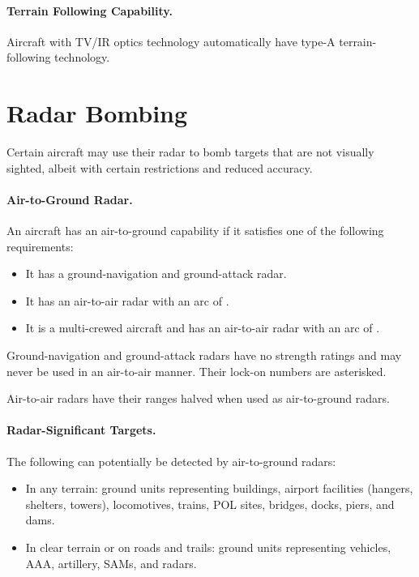 \begin{advancedrules}
{\paragraph{Terrain Following Capability.} Aircraft with TV/IR optics technology automatically have type-A terrain-following technology.

\section{Radar Bombing}

Certain aircraft may use their radar to bomb targets that are not visually sighted, albeit with certain restrictions and reduced accuracy.

\paragraph{Air-to-Ground Radar.} An aircraft has an air-to-ground capability if it satisfies one of the following requirements: 
\begin{itemize}
\item It has a ground-navigation and ground-attack radar.
\item It has an air-to-air radar with an arc of .
\item It is a multi-crewed aircraft and has an air-to-air radar with an arc of .
\end{itemize}

Ground-navigation and ground-attack radars have no strength ratings and may never be used in an air-to-air manner. Their lock-on numbers are asterisked.

Air-to-air radars have their ranges halved when used as air-to-ground radars.

\paragraph{Radar-Significant Targets.} The following can potentially be detected by air-to-ground radars:

\begin{itemize}

    \item In any terrain: ground units representing buildings, airport facilities (hangers, shelters, towers), locomotives, trains, POL sites, bridges, docks, piers, and dams.

    \item In clear terrain or on roads and trails: ground units representing vehicles, AAA, artillery, SAMs, and radars.


\end{itemize}}
\end{advancedrules}
